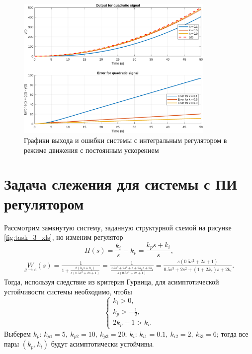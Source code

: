 \begin{figure}[H]
    \centering
    \includegraphics[width=0.85\textwidth]{figs/task_4_out_quadratic.png}
    \caption{Графики выхода и ошибки системы с интегральным регулятором в режиме движения с постоянным ускорением}
    \label{fig:task_4_out_quadratic}
\end{figure}



\section{Задача слежения для системы с ПИ регулятором}

Рассмотрим замкнутую систему, заданную структурной схемой на рисунке \ref{fig:task_3_xls},
но изменим регулятор
\begin{equation*}
    H(s)=\frac{{k_i}}{s}+k_p=\frac{k_ps+k_i}{s},
\end{equation*}
\begin{multline*}
    \underset{g\rightarrow e}{W}(s)
    =\frac{1}{1+\frac{2(k_ps+k_i)}{s(0.5s^2+2s+1)}}
    =\frac{1}{\frac{0.5s^3+2s^2+s+2k_ps+2k_i}{s(0.5s^2+2s+1)}}
    =\frac{s(0.5s^2+2s+1)}{0.5s^3+2s^2+(1+2k_p)s+2k_i}.
\end{multline*}
Тогда, используя следствие из критерия Гурвица, для асимптотической устойчивости системы
необходимо, чтобы 
\begin{equation*}
    \begin{cases}
        k_i>0,\\
        k_p>-\frac{1}{2},\\
        2k_p+1>k_i.
    \end{cases}
\end{equation*} 
Выберем $k_p$: $k_{p1}=5,\ k_{p2}=10,\ k_{p3}=20$;
$k_i$: $k_{i1}=0.1,\ k_{i2}=2,\ k_{i3}=6$; тогда все пары $(k_p,k_i)$ будут
асимптотически устойчивы.

